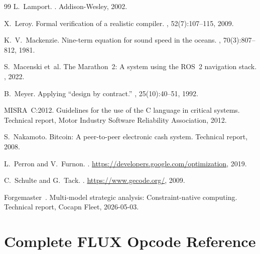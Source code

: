 \documentclass[sigplan,10pt,review]{acmart}
\begin{document}
\begin{thebibliography}{99}
L.~Lamport.
.
\newblock Addison-Wesley, 2002.

X.~Leroy.
\newblock Formal verification of a realistic compiler.
, 52(7):107--115, 2009.

K.~V.~Mackenzie.
\newblock Nine-term equation for sound speed in the oceans.
, 70(3):807--812, 1981.

S.~Macenski et~al.
\newblock The {Marathon~2}: A system using the {ROS~2} navigation stack.
, 2022.

B.~Meyer.
\newblock Applying ``design by contract.''
, 25(10):40--51, 1992.

{MISRA~C:2012}.
\newblock Guidelines for the use of the {C} language in critical systems.
\newblock Technical report, Motor Industry Software Reliability Association, 2012.

S.~Nakamoto.
\newblock Bitcoin: A peer-to-peer electronic cash system.
\newblock Technical report, 2008.

L.~Perron and V.~Furnon.
.
\newblock \url{https://developers.google.com/optimization}, 2019.

C.~Schulte and G.~Tack.
.
\newblock \url{https://www.gecode.org/}, 2009.

Forgemaster~{}.
\newblock Multi-model strategic analysis: Constraint-native computing.
\newblock Technical report, Cocapn Fleet, 2026-05-03.

\end{thebibliography}

\appendix
\section{Complete FLUX Opcode Reference}
\label{app:opcodes}
\end{document}
